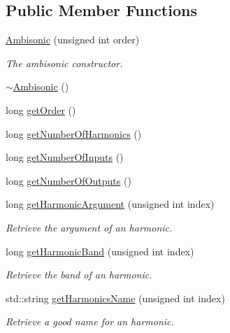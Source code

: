 \subsection*{Public Member Functions}
\begin{DoxyCompactItemize}
\item 
\hyperlink{class_hoa2_d_1_1_ambisonic_a43f91832422c0b59f92f02978dc1e541}{Ambisonic} (unsigned int order)
\begin{DoxyCompactList}\small\item\em The ambisonic constructor. \end{DoxyCompactList}\item 
\hyperlink{class_hoa2_d_1_1_ambisonic_a082fc2e3f9910703ddb49b9a478329bf}{$\sim$\-Ambisonic} ()
\item 
long \hyperlink{class_hoa2_d_1_1_ambisonic_a677405a1c3aa359753bd675d4614e7da}{get\-Order} ()
\item 
long \hyperlink{class_hoa2_d_1_1_ambisonic_aa9d613f38e6876326201995a5a415410}{get\-Number\-Of\-Harmonics} ()
\item 
long \hyperlink{class_hoa2_d_1_1_ambisonic_af03625afb9f21ef3574eafa8501129b4}{get\-Number\-Of\-Inputs} ()
\item 
long \hyperlink{class_hoa2_d_1_1_ambisonic_a126ed3be1aa3d155f56ca75ca3d69de5}{get\-Number\-Of\-Outputs} ()
\item 
long \hyperlink{class_hoa2_d_1_1_ambisonic_a3acaabfd013671c94e057e23eea1d068}{get\-Harmonic\-Argument} (unsigned int index)
\begin{DoxyCompactList}\small\item\em Retrieve the argument of an harmonic. \end{DoxyCompactList}\item 
long \hyperlink{class_hoa2_d_1_1_ambisonic_a06ecceb7aef44cd7008fd8beaf8cf33e}{get\-Harmonic\-Band} (unsigned int index)
\begin{DoxyCompactList}\small\item\em Retrieve the band of an harmonic. \end{DoxyCompactList}\item 
std\-::string \hyperlink{class_hoa2_d_1_1_ambisonic_a1b4578538f4fd0d311102b2f3ec4dac6}{get\-Harmonics\-Name} (unsigned int index)
\begin{DoxyCompactList}\small\item\em Retrieve a good name for an harmonic. \end{DoxyCompactList}\end{DoxyCompactItemize}


